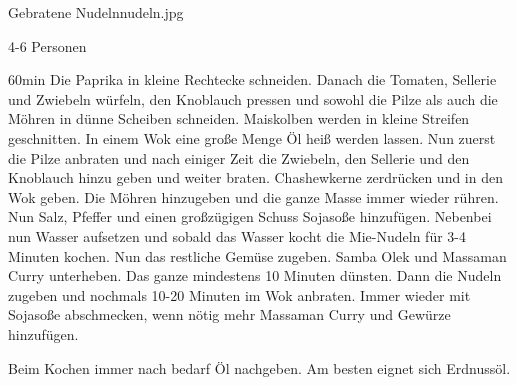 \documentclass[fontsize=11pt,a4paper,toc=bibliography,listof=totoc]{scrbook}
\begin{document}
\begin{Rezept}{Gebratene Nudeln}{nudeln.jpg}		
	\begin{zutaten}{4-6 Personen}
	\end{zutaten}		
	\begin{zubereitung}{60min}
		Die Paprika in kleine Rechtecke schneiden. Danach die Tomaten, Sellerie und Zwiebeln würfeln, den Knoblauch pressen und sowohl die Pilze als auch die Möhren in dünne Scheiben schneiden. Maiskolben werden in kleine Streifen geschnitten. In einem Wok eine große Menge Öl heiß werden lassen. Nun zuerst die Pilze anbraten und nach einiger Zeit die Zwiebeln, den Sellerie und den Knoblauch hinzu geben und weiter braten. Chashewkerne zerdrücken und in den Wok geben. Die Möhren hinzugeben und die ganze Masse immer wieder rühren. Nun Salz, Pfeffer und einen großzügigen Schuss Sojasoße hinzufügen. Nebenbei nun Wasser aufsetzen und sobald das Wasser kocht die Mie-Nudeln für 3-4 Minuten kochen. Nun das restliche Gemüse zugeben. Samba Olek und Massaman Curry unterheben. Das ganze mindestens 10 Minuten dünsten. Dann die Nudeln zugeben und nochmals 10-20 Minuten im Wok anbraten. Immer wieder mit Sojasoße abschmecken, wenn nötig mehr Massaman Curry und Gewürze hinzufügen.
		
		Beim Kochen immer nach bedarf Öl nachgeben. Am besten eignet sich Erdnussöl.
	\end{zubereitung}
\end{Rezept}
\end{document}
